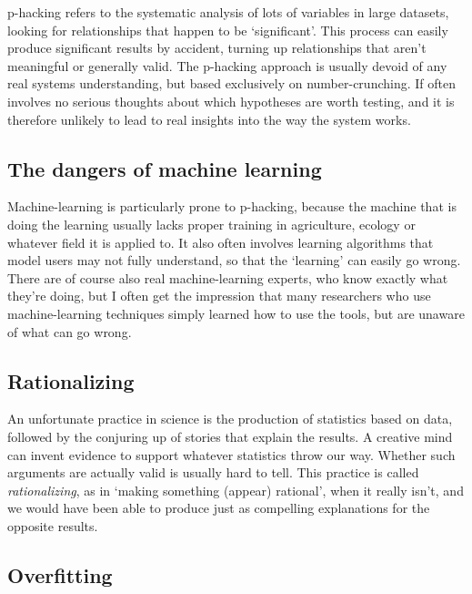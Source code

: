 \documentclass[
]{book}
\begin{document}
p-hacking refers to the systematic analysis of lots of variables in large datasets, looking for relationships that happen to be `significant'. This process can easily produce significant results by accident, turning up relationships that aren't meaningful or generally valid. The p-hacking approach is usually devoid of any real systems understanding, but based exclusively on number-crunching. If often involves no serious thoughts about which hypotheses are worth testing, and it is therefore unlikely to lead to real insights into the way the system works.

\hypertarget{the-dangers-of-machine-learning}{%
\subsection{The dangers of machine learning}\label{the-dangers-of-machine-learning}}

Machine-learning is particularly prone to p-hacking, because the machine that is doing the learning usually lacks proper training in agriculture, ecology or whatever field it is applied to. It also often involves learning algorithms that model users may not fully understand, so that the `learning' can easily go wrong. There are of course also real machine-learning experts, who know exactly what they're doing, but I often get the impression that many researchers who use machine-learning techniques simply learned how to use the tools, but are unaware of what can go wrong.

\hypertarget{rationalizing}{%
\subsection{Rationalizing}\label{rationalizing}}

An unfortunate practice in science is the production of statistics based on data, followed by the conjuring up of stories that explain the results. A creative mind can invent evidence to support whatever statistics throw our way. Whether such arguments are actually valid is usually hard to tell. This practice is called \emph{rationalizing}, as in `making something (appear) rational', when it really isn't, and we would have been able to produce just as compelling explanations for the opposite results.

\hypertarget{overfitting}{%
\subsection{Overfitting}\label{overfitting}}
\end{document}
